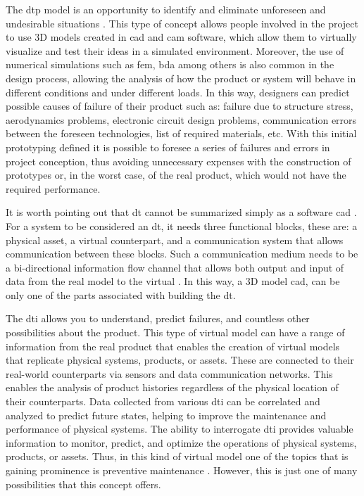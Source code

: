 The \acrshort{dtp} model is an opportunity to identify and eliminate unforeseen and undesirable situations \cite{Grieves2017}. This type of concept allows people involved in the project to use 3D models created in \acrfull{cad} and \acrfull{cam} software, which allow them to virtually visualize and test their ideas in a simulated environment. Moreover, the use of numerical simulations such as \acrfull{fem}, \acrfull{bda} among others is also common in the design process, allowing the analysis of how the product or system will behave in different conditions and under different loads. In this way, designers can predict possible causes of failure of their product such as: failure due to structure stress, aerodynamics problems, electronic circuit design problems, communication errors between the foreseen technologies, list of required materials, etc. With this initial prototyping defined it is possible to foresee a series of failures and errors in project conception, thus avoiding unnecessary expenses with the construction of prototypes or, in the worst case, of the real product, which would not have the required performance. 

  
It is worth pointing out that \acrshort{dt} cannot be summarized simply as a software \acrshort{cad} \cite{Barricelli2019}.  For a system to be considered an \acrshort{dt}, it needs three functional blocks, these are: a physical asset, a virtual counterpart, and a communication system that allows communication between these blocks. Such a communication medium needs to be a bi-directional information flow channel that allows both output and input of data from the real model to the virtual \cite{Mihai2022}. In this way, a 3D model \acrshort{cad}, can be only one of the parts associated with building the \acrlong{dt}. 



The \acrlong{dti} allows you to understand, predict failures, and countless other possibilities about the product. This type of virtual model can have a range of information from the real product that enables the creation of virtual models that replicate physical systems, products, or assets. These are connected to their real-world counterparts via sensors and data communication networks. This enables the analysis of product histories regardless of the physical location of their counterparts. Data collected from various \acrshort{dti} can be correlated and analyzed to predict future states, helping to improve the maintenance and performance of physical systems. The ability to interrogate \acrshort{dti} provides valuable information to monitor, predict, and optimize the operations of physical systems, products, or assets. Thus, in this kind of virtual model one of the topics that is gaining prominence is preventive maintenance \cite{Grieves2017}. However, this is just one of many possibilities that this concept offers. 
  
